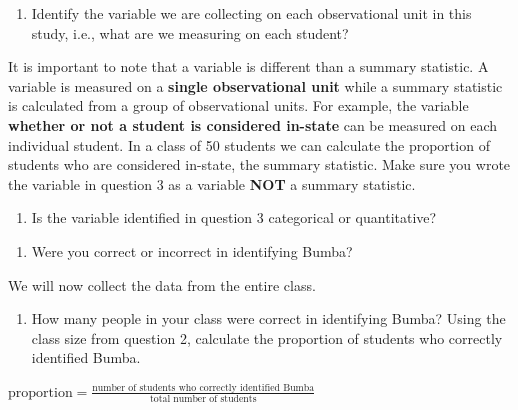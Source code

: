 \documentclass[
]{report}
\providecommand{\tightlist}{%
  \setlength{\itemsep}{0pt}\setlength{\parskip}{0pt}}
\begin{document}
\begin{enumerate}
\def\labelenumi{\arabic{enumi}.}
\setcounter{enumi}{2}
\tightlist
\item
  Identify the variable we are collecting on each observational unit in this study, i.e., what are we measuring on each student?
\end{enumerate}

\vspace{.8in}

It is important to note that a variable is different than a summary statistic. A variable is measured on a \textbf{single observational unit} while a summary statistic is calculated from a group of observational units. For example, the variable \textbf{whether or not a student is considered in-state} can be measured on each individual student. In a class of 50 students we can calculate the proportion of students who are considered in-state, the summary statistic. Make sure you wrote the variable in question 3 as a variable \textbf{NOT} a summary statistic.

\begin{enumerate}
\def\labelenumi{\arabic{enumi}.}
\setcounter{enumi}{3}
\tightlist
\item
  Is the variable identified in question 3 categorical or quantitative?
\end{enumerate}

\vspace{0.3in}

\begin{enumerate}
\def\labelenumi{\arabic{enumi}.}
\setcounter{enumi}{4}
\tightlist
\item
  Were you correct or incorrect in identifying Bumba?
\end{enumerate}

\vspace{0.3in}

We will now collect the data from the entire class.

\begin{enumerate}
\def\labelenumi{\arabic{enumi}.}
\setcounter{enumi}{5}
\tightlist
\item
  How many people in your class were correct in identifying Bumba? Using the class size from question 2, calculate the proportion of students who correctly identified Bumba.
\end{enumerate}

\begin{center}
$\mbox{proportion} = \frac{\mbox{number of students who correctly identified Bumba}}{\mbox{total number of students}}$
\end{center}
\end{document}
